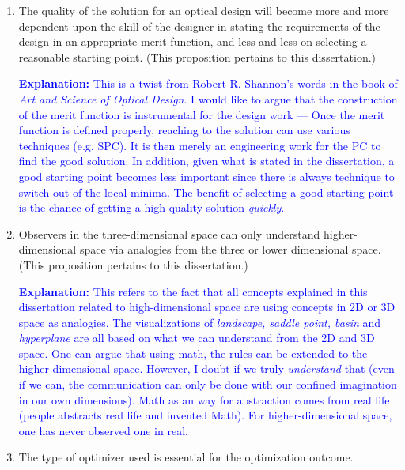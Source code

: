 \documentclass{dissertation}
\begin{document}
\begin{enumerate}

\item The quality of the solution for an optical design will become more and more dependent upon the skill of the designer in stating the requirements of the design in an appropriate merit function, and less and less on selecting a reasonable starting point. 
\small{(This proposition pertains to this dissertation.)}
\normalsize%

 \textcolor{blue}{\textbf{Explanation:} This is a twist from Robert R. Shannon's words in the book of \textit{Art and Science of Optical Design}. I would like to argue that the construction of the merit function is instrumental for the design work --- Once the merit function is defined properly, reaching to the solution can use various techniques (e.g. SPC). It is then merely an engineering work for the PC to find the  good solution. In addition, given what is stated in the dissertation, a good starting point becomes less important since there is always technique to switch out of the local minima. The benefit of selecting a good starting point is the chance of getting a high-quality solution \textit{quickly}.}  

\item Observers in the three-dimensional space can only understand higher-dimensional space via analogies from the three or lower dimensional space.
\small{(This proposition pertains to this dissertation.)}
\normalsize

\textcolor{blue}{\textbf{Explanation:} This refers to the fact that all concepts explained in this dissertation related to high-dimensional space are using concepts in 2D or 3D space as analogies. The visualizations of \textit{landscape, saddle point, basin} and \textit{hyperplane} are all based on what we can understand from the 2D and 3D space. One can argue that using math, the rules can be extended to the higher-dimensional space. However, I doubt if we truly \textit{understand} that (even if we can, the communication can only be done with our confined imagination in our own dimensions). Math as an way for abstraction comes from real life (people abstracts real life and invented Math). For higher-dimensional space, one has never observed one in real. }

\item The type of optimizer used is essential for the optimization outcome.


\end{enumerate}
\end{document}
